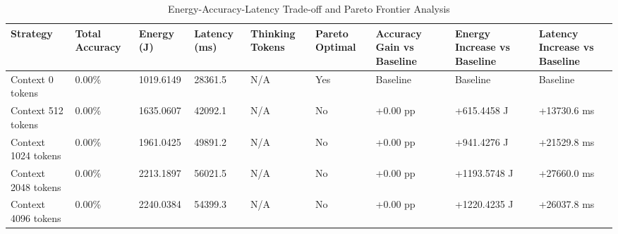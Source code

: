 \begin{table}
\caption{Energy-Accuracy-Latency Trade-off and Pareto Frontier Analysis}
\label{tab:tradeoff_comparison}
\begin{tabular}{lllllllll}
\toprule
Strategy & Total Accuracy & Energy (J) & Latency (ms) & Thinking Tokens & Pareto Optimal & Accuracy Gain vs Baseline & Energy Increase vs Baseline & Latency Increase vs Baseline \\
\midrule
Context 0 tokens & 0.00\% & 1019.6149 & 28361.5 & N/A & Yes & Baseline & Baseline & Baseline \\
Context 512 tokens & 0.00\% & 1635.0607 & 42092.1 & N/A & No & +0.00 pp & +615.4458 J & +13730.6 ms \\
Context 1024 tokens & 0.00\% & 1961.0425 & 49891.2 & N/A & No & +0.00 pp & +941.4276 J & +21529.8 ms \\
Context 2048 tokens & 0.00\% & 2213.1897 & 56021.5 & N/A & No & +0.00 pp & +1193.5748 J & +27660.0 ms \\
Context 4096 tokens & 0.00\% & 2240.0384 & 54399.3 & N/A & No & +0.00 pp & +1220.4235 J & +26037.8 ms \\
\bottomrule
\end{tabular}
\end{table}
